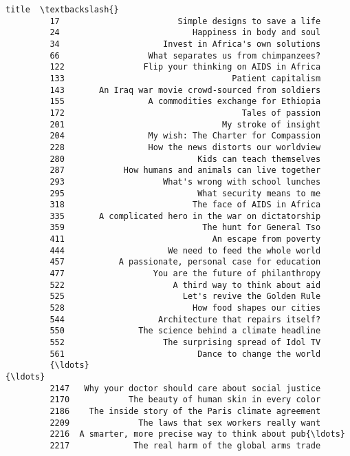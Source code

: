 \documentclass[11pt]{article}
\begin{document}
\begin{Verbatim}[commandchars=\\\{\}]
                                                           title  \textbackslash{}
         17                        Simple designs to save a life   
         24                           Happiness in body and soul   
         34                     Invest in Africa's own solutions   
         66                  What separates us from chimpanzees?   
         122                Flip your thinking on AIDS in Africa   
         133                                  Patient capitalism   
         143       An Iraq war movie crowd-sourced from soldiers   
         155                 A commodities exchange for Ethiopia   
         172                                    Tales of passion   
         201                                My stroke of insight   
         204                 My wish: The Charter for Compassion   
         228                 How the news distorts our worldview   
         280                           Kids can teach themselves   
         287            How humans and animals can live together   
         293                    What's wrong with school lunches   
         295                           What security means to me   
         318                          The face of AIDS in Africa   
         335       A complicated hero in the war on dictatorship   
         359                            The hunt for General Tso   
         411                              An escape from poverty   
         444                     We need to feed the whole world   
         457           A passionate, personal case for education   
         477                  You are the future of philanthropy   
         522                      A third way to think about aid   
         525                        Let's revive the Golden Rule   
         528                          How food shapes our cities   
         544                   Architecture that repairs itself?   
         550               The science behind a climate headline   
         552                    The surprising spread of Idol TV   
         561                           Dance to change the world   
         {\ldots}                                                 {\ldots}   
         2147   Why your doctor should care about social justice   
         2170            The beauty of human skin in every color   
         2186    The inside story of the Paris climate agreement   
         2209              The laws that sex workers really want   
         2216  A smarter, more precise way to think about pub{\ldots}   
         2217             The real harm of the global arms trade   

\end{Verbatim}
\end{document}
